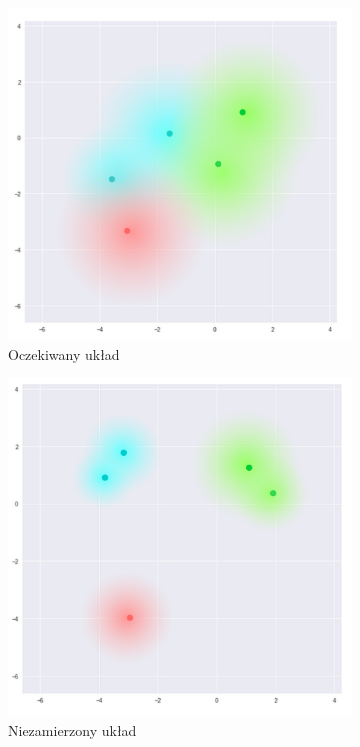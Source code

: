 \begin{figure}[h!]
  \centering
  \begin{subfigure}[b]{0.4\linewidth}
    \includegraphics[width=1.0\textwidth]{images/vae_nolimits_a}
    \caption{Oczekiwany układ}
  \end{subfigure}
  \begin{subfigure}[b]{0.4\linewidth}
    \includegraphics[width=1.0\textwidth]{images/vae_nolimits_b}
    \caption{Niezamierzony układ}
  \end{subfigure}
  \caption{}
  \label{fig:vae_vs_stand}
\end{figure}

